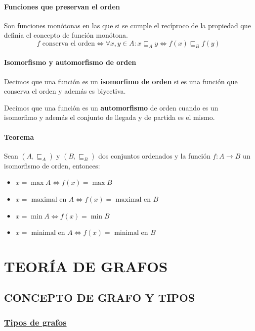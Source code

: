 \documentclass[10pt,a4paper,openright]{book}
\begin{document}
\subsubsection*{Funciones que preservan el orden}
Son funciones monótonas en las que si se cumple el recíproco de la propiedad que definía el concepto de función monótona.
$$f\mbox{ conserva el orden} \Leftrightarrow \forall x,y\in A: x\sqsubseteq_A y \Leftrightarrow f(x)\sqsubseteq_B f(y)$$

\subsubsection*{Isomorfismo y automorfismo de orden}
Decimos que una función es un \textbf{isomorfimo de orden} si es una función que conserva el orden y además es biyectiva.\par
Decimos que una función es un \textbf{automorfismo} de orden cuando es un isomorfimo y además el conjunto de llegada y de partida es el mismo.

\subsubsection*{Teorema}
Sean $(A,\sqsubseteq_A)$ y $(B,\sqsubseteq_B)$ dos conjuntos ordenados y la función $f: A\rightarrow B$ un isomorfismo de orden, entonces:
\begin{itemize}
\item $x=\max A\Leftrightarrow f(x)=\max B$
\item $x=\mbox{ maximal en }  A\Leftrightarrow f(x)=\mbox{ maximal en } B$
\item $x=\min A\Leftrightarrow f(x)=\min B$
\item $x=\mbox{ minimal en }  A\Leftrightarrow f(x)=\mbox{ minimal en } B$
\end{itemize}

\chapter*{TEORÍA DE GRAFOS}
\section*{CONCEPTO DE GRAFO Y TIPOS}
\subsection*{\underline{Tipos de grafos}}
\end{document}
